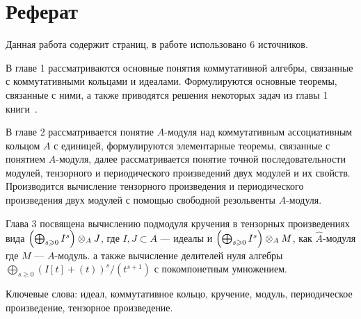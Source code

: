 \section*{Реферат}
    Данная работа содержит \pageref{LastPage} страниц, в работе использовано 6 источников.

    В главе 1 рассматриваются основные понятия коммутативной алгебры, связанные с коммутативными
    кольцами и идеалами. Формулируются основные теоремы, связанные с ними, а также приводятся 
    решения некоторых задач из главы 1 книги~\cite{A-M}. 

    В главе 2 рассматривается понятие $A$-модуля 
    над коммутативным ассоциативным кольцом $A$ с единицей, формулируются элементарные теоремы, связанные с понятием $A$-модуля, далее
    рассматривается понятие точной последовательности модулей, тензорного и периодического 
    произведений двух модулей и их свойств. Производится вычисление тензорного произведения 
    и периодического произведения двух модулей  с помощью свободной резольвенты $A$-модуля. 
    
    Глава 3 посвящена вычислению подмодуля кручения в тензорных произведениях вида 
    $\left(\bigoplus_{s \geqslant 0} I^s \right) \otimes_A J$, где $I, J \subset A$ --- идеалы и 
    $\left(\bigoplus_{s \geqslant 0} I^s \right) \otimes_A M$, как $\hat A$-модуля где $M$ --- $A$-модуль.
    а также вычисление делителей нуля алгебры 
    $\bigoplus_{s \geq 0}{(I[t] + (t))^s / (t^{s + 1})}$ с покомпонетным умножением.

    Ключевые слова: идеал,
    коммутативное кольцо,
    кручение,
    модуль,
    периодическое произведение,
    тензорное произведение.
    
